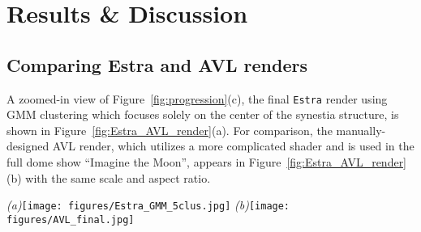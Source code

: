 \documentclass[fleqn,usenatbib,useAMS]{mnras}
\begin{document}
\section{Results \& Discussion}\label{sec:Results}


\subsection{Comparing Estra and AVL renders}


A zoomed-in view of Figure~\ref{fig:progression}(c), the final \texttt{Estra} render using GMM clustering which focuses solely on the center of the synestia structure, is shown in Figure~\ref{fig:Estra_AVL_render}(a). For comparison, the manually-designed AVL render, which utilizes a more complicated shader and is used in the full dome show ``Imagine the Moon'', appears in Figure~\ref{fig:Estra_AVL_render}(b) with the same scale and aspect ratio.
%
\begin{figure*}
 \begin{minipage}[c]{1.0\linewidth}
  \centering
  \begin{center}
  \textit{(a)}{\texttt{[image: figures/Estra\_GMM\_5clus.jpg]}}
  \textit{(b)}{\texttt{[image: figures/AVL\_final.jpg]}}
  \caption{The final renders of the synestia (of the exact view shown in Figure~\ref{fig:synestia_viewport}) using \textit{(a)} the \texttt{Estra} shader---with its colormap informed by the 5-cluster GMM result (Figure~\ref{fig:temperature_ramp}(a))---and \textit{(b)} the AVL's more complicated, custom shader not informed by a machine learning algorithm (colormap from Figure~\ref{fig:temperature_ramp}(b)). Although choosing the appropriate clustering algorithm and developing the pipeline took one of us (P. D. Aleo) approximately two months, $(a)$ was created in approximately a day's work once the workflow was established. Meanwhile, the timeframe for $(b)$ was similar, but involved the work of three visualization designers (A.J. Christensen, K. Borkiewicz, R. Patterson). This demonstrates how a scientist can create a simplified yet accurate visualization of their own work, comparable to the quality of one produced by a professional
visualization team.}
  \label{fig:Estra_AVL_render}
  \end{center}
  \end{minipage}
\end{figure*}
%
\end{document}
